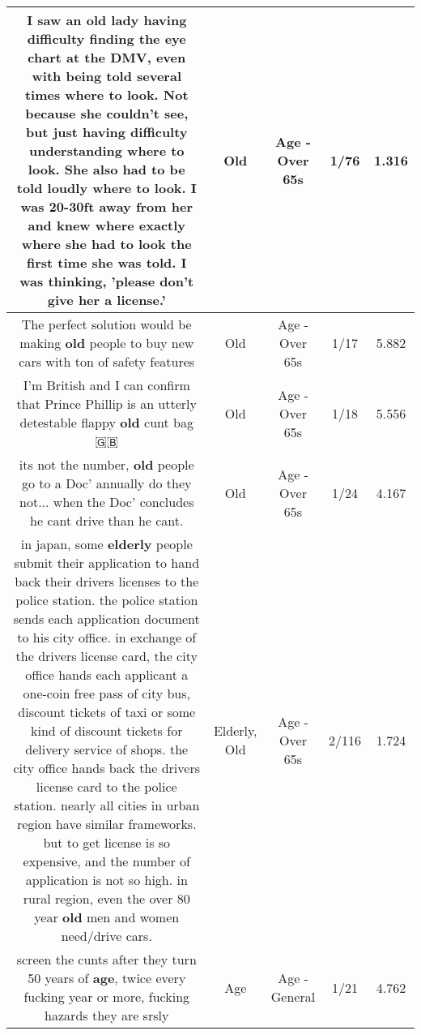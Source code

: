 \documentclass[11pt]{article}
\newlength\mylength
\begin{document}
\begin{center}
\begin{longtable}{|C{.65\mylength}|C{.30\mylength}|C{.12\mylength}|C{.12\mylength}|C{.12\mylength}|}
  \small I saw an \textbf{old} lady having difficulty finding the eye chart at the DMV, even with being told several times where to look. Not because she couldn't see, but just having difficulty understanding where to look. She also had to be told loudly where to look. I was 20-30ft away from her and knew where exactly where she had to look the first time she was told. I was thinking, 'please don't give her a license.'\normalsize   & Old & Age - Over 65s & 1/76 & 1.316 \\  \hline
  \small The perfect solution would be making \textbf{old} people to buy new cars with ton of safety features\normalsize   & Old & Age - Over 65s & 1/17 & 5.882 \\  \hline
  \small I'm British and I can confirm that Prince Phillip is an utterly detestable flappy \textbf{old} cunt bag 🇬🇧\normalsize   & Old & Age - Over 65s & 1/18 & 5.556 \\  \hline
  \small its not the number, \textbf{old} people go to a Doc' annually do they not... when the Doc' concludes he cant drive than he cant.\normalsize   & Old & Age - Over 65s & 1/24 & 4.167 \\  \hline
  \small in japan, some \textbf{elderly} people submit their application to hand back their drivers licenses to the police station. the police station sends each application document to his city office. in exchange of the drivers license card, the city office hands each applicant a one-coin free pass of city bus, discount tickets of taxi or some kind of discount tickets for delivery service of shops. the city office hands back the drivers license card to the police station. nearly all cities in urban region have similar frameworks. but to get license is so expensive, and the number of application is not so high. in rural region,  even the over 80 year \textbf{old} men and women need/drive cars.\normalsize   & Elderly, Old & Age - Over 65s & 2/116 & 1.724 \\  \hline
  \small screen the cunts after they turn 50 years of \textbf{age}, twice every fucking year or more, fucking hazards they are srsly\normalsize   & Age & Age - General & 1/21 & 4.762 \\  \hline

\end{longtable}
\end{center}
\end{document}

